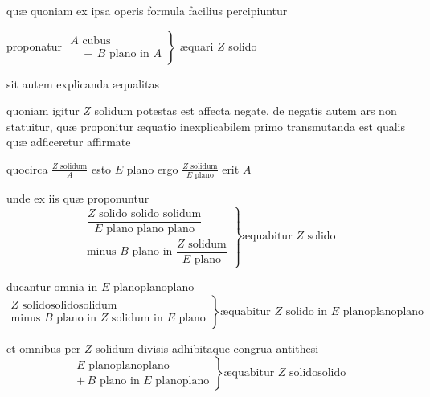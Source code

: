 \documentclass[11pt,a4paper]{article}
\begin{document}
quæ quoniam ex ipsa operis formula facilius percipiuntur

proponatur $\left. \begin{array}{l} A \text{ cubus} \\ \quad -\,B \text{ plano in } A \end{array} \right\}$ æquari $Z$ solido

sit autem explicanda æqualitas

quoniam igitur $Z$ solidum potestas est affecta negate, de negatis autem ars non statuitur, quæ proponitur æquatio inexplicabilem primo transmutanda est qualis quæ adficeretur affirmate

quocirca $\frac{Z \text{ solidum}}{A}$ esto $E$ plano ergo $\frac{Z \text{ solidum}}{E \text{ plano}}$ erit $A$


unde ex iis quæ proponuntur
\[ \left. \begin{array}{l} \dfrac{Z \text{ solido solido solidum}}{E \text{ plano plano plano}} \\[2ex] \text{minus } B \text{ plano in } \dfrac{Z \text{ solidum}}{E \text{ plano}} \end{array} \right\} \text{æquabitur } Z \text{ solido} \]

ducantur omnia in $E$ planoplanoplano
\[ \left. \begin{array}{l} Z \text{ solidosolidosolidum} \\ \text{minus } B \text{ plano in } Z \text{ solidum in } E \text{ plano} \end{array} \right\} \text{æquabitur } Z \text{ solido in } E \text{ planoplanoplano} \]

et omnibus per $Z$ solidum divisis adhibitaque congrua antithesi
\[ \left. \begin{array}{l} E \text{ planoplanoplano} \\ +\,B \text{ plano in } E \text{ planoplano} \end{array} \right\} \text{æquabitur } Z \text{ solidosolido} \]
\end{document}
